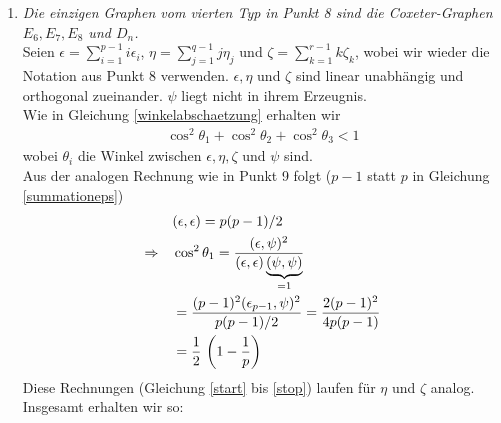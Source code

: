 \documentclass[a4paper,12pt]{article}
\begin{document}
\begin{enumerate}
\item \emph{Die einzigen Graphen vom vierten Typ in Punkt 8 sind die Coxeter-Graphen $E_6, E_7, E_8$ und $D_n$.}\\
Seien $\epsilon = \sum_{i=1}^{p-1} i\epsilon_i$, $\eta = \sum_{j=1}^{q-1} j\eta_j$ und $\zeta = \sum_{k=1}^{r-1} k \zeta_k$, wobei wir wieder die Notation aus Punkt 8 verwenden. $\epsilon, \eta$ und $\zeta$ sind linear unabhängig und orthogonal zueinander. $\psi$ liegt nicht in ihrem Erzeugnis.\\
Wie in Gleichung \eqref{winkelabschaetzung} erhalten wir
\begin{align*}
\cos ^2 \theta_1 + \cos ^2 \theta_2 + \cos ^2 \theta_ 3 < 1
\end{align*}
wobei $\theta_i$ die Winkel zwischen $\epsilon,\eta,\zeta$ und $\psi$ sind. \\
Aus der analogen Rechnung wie in Punkt 9 folgt ($p-1$ statt $p$ in Gleichung \eqref{summationeps})
\begin{align}
&(\epsilon,\epsilon) = p(p-1)/2\label{start} \\
\Rightarrow\quad & \cos ^2 \theta_1 = \frac{(\epsilon,\psi)^2}{(\epsilon,\epsilon)\underbrace{(\psi,\psi)}_{=1}}\notag\\
& = \frac{(p-1)^2 (\epsilon_{p-1},\psi)^2}{p(p-1)/2} = \frac{2(p-1)^2}{4p(p-1)}\notag\\
&= \frac{1}{2} \, \left( 1-\frac{1}{p} \right)\label{stop}
\end{align}
Diese Rechnungen (Gleichung \eqref{start} bis \eqref{stop}) laufen für $\eta$ und $\zeta$ analog. Insgesamt erhalten wir so: 


\end{enumerate}
\end{document}
